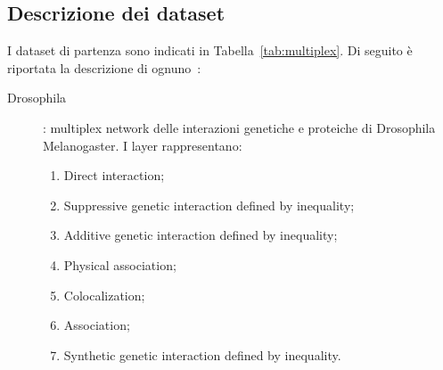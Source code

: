 \subsection{Descrizione dei dataset}
I dataset di partenza sono indicati in Tabella~\ref{tab:multiplex}.
Di seguito è riportata la descrizione di ognuno~\cite{data:multiplex}\cite{dedomenico:structred}\cite{stark:biogrid}:
\begin{description}
    \item[Drosophila]: multiplex network delle interazioni genetiche e proteiche di 
    Drosophila Melanogaster. I layer rappresentano:
    \begin{enumerate}
        \item Direct interaction;
        \item Suppressive genetic interaction defined by inequality;
        \item Additive genetic interaction defined by inequality;
        \item Physical association;
        \item Colocalization;
        \item Association;
        \item Synthetic genetic interaction defined by inequality.
    \end{enumerate} 
    

\end{description}
